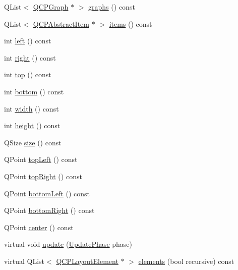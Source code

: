 \begin{DoxyCompactItemize}
\item 
Q\+List$<$ \hyperlink{class_q_c_p_graph}{Q\+C\+P\+Graph} $\ast$ $>$ \hyperlink{class_q_c_p_axis_rect_afa4ff90901d9275f670e24b40e3c1b25}{graphs} () const 
\item 
Q\+List$<$ \hyperlink{class_q_c_p_abstract_item}{Q\+C\+P\+Abstract\+Item} $\ast$ $>$ \hyperlink{class_q_c_p_axis_rect_a0f17ed539962cfcbaca8ce0b1776c840}{items} () const 
\item 
int \hyperlink{class_q_c_p_axis_rect_a55b3ecf72a3a65b053f7651b88db458d}{left} () const 
\item 
int \hyperlink{class_q_c_p_axis_rect_a6d0f989fc552aa2b563cf82f8fc81e61}{right} () const 
\item 
int \hyperlink{class_q_c_p_axis_rect_ac45aef1eb75cea46b241b6303028a607}{top} () const 
\item 
int \hyperlink{class_q_c_p_axis_rect_af2b5982ebe7e6f781b9bf1cc371a60d8}{bottom} () const 
\item 
int \hyperlink{class_q_c_p_axis_rect_a45bf5c17f4ca29131b7eb0db06efc259}{width} () const 
\item 
int \hyperlink{class_q_c_p_axis_rect_a1c55c4f3bef40cf01b21820316c8469e}{height} () const 
\item 
Q\+Size \hyperlink{class_q_c_p_axis_rect_a871b9fe49e92b39a3cbe29a59e458536}{size} () const 
\item 
Q\+Point \hyperlink{class_q_c_p_axis_rect_a88acbe716bcf5072790a6f95637c40d8}{top\+Left} () const 
\item 
Q\+Point \hyperlink{class_q_c_p_axis_rect_a232409546394c23b59407bc62fa460a8}{top\+Right} () const 
\item 
Q\+Point \hyperlink{class_q_c_p_axis_rect_a724b0333971ea6a338f0dbd814dc97ae}{bottom\+Left} () const 
\item 
Q\+Point \hyperlink{class_q_c_p_axis_rect_a49ea3c7dff834b47e266cbf3d79f78b9}{bottom\+Right} () const 
\item 
Q\+Point \hyperlink{class_q_c_p_axis_rect_aea5e6042bca198424fa1bc02fc282e59}{center} () const 
\item 
virtual void \hyperlink{class_q_c_p_axis_rect_a255080a017df9083a60a321ef2ba9ed8}{update} (\hyperlink{class_q_c_p_layout_element_a0d83360e05735735aaf6d7983c56374d}{Update\+Phase} phase)
\item 
virtual Q\+List$<$ \hyperlink{class_q_c_p_layout_element}{Q\+C\+P\+Layout\+Element} $\ast$ $>$ \hyperlink{class_q_c_p_axis_rect_a2bda6bf2b5b5797f92583cecd01c8949}{elements} (bool recursive) const 
\end{DoxyCompactItemize}
